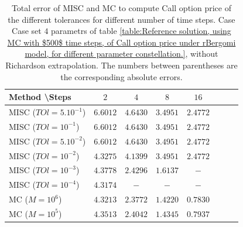 \documentclass[11pt]{article}
\begin{document}
\begin{table}[h!]
	\centering
	\begin{tabular}{l*{6}{c}r}
		Method \textbackslash  Steps            & $2$ & $4$ & $8$ & $16$  \\
		\hline
		MISC ($TOl=5.10^{-1}$)  & $\mathbf{6.6012}$ & $\mathbf{ 4.6430}$ & $\mathbf{3.4951}$ & $\mathbf{ 2.4772}$  \\
		MISC ($TOl=10^{-1}$)  & $\mathbf{6.6012}$ & $\mathbf{ 4.6430}$& $\mathbf{3.4951}$ & $\mathbf{ 2.4772}$ \\
		MISC ($TOl=5.10^{-2}$)  &$\mathbf{6.6012}$& $\mathbf{ 4.6430}$& $\mathbf{3.4951}$ & $\mathbf{ 2.4772}$ \\
		MISC ($TOl=10^{-2}$)  & $\mathbf{ 4.3275}$ & $\mathbf{4.1399}$ & $\mathbf{3.4951}$ & $\mathbf{ 2.4772}$  \\
		
		MISC ($TOl=10^{-3}$)  & $\mathbf{ 4.3778}$ & $\mathbf{2.4296}$ & $\mathbf{1.6137}$ & $\mathbf{ -}$  \\
		MISC ($TOl=10^{-4}$)  & $\mathbf{ 4.3174}$ & $\mathbf{-}$ & $\mathbf{-}$ & $\mathbf{ -}$  \\
		\hline
		MC  ($M=10^6$)   & $\mathbf{ 4.3213}$  & $\mathbf{2.3772
		}$  & $\mathbf{
			1.4220
		}$ & $\mathbf{  0.7830
		}$  \\	
		
		MC  ($M=10^5$)   & $\mathbf{4.3513}$  & $\mathbf{2.4042
		}$  & $\mathbf{
			1.4345
		}$ & $\mathbf{  0.7937
		}$  \\		
		
		\hline
	\end{tabular}
	\caption{Total error of MISC and MC to compute Call option price of the different tolerances for different number of time steps. Case Case set $4$ parametrs of table \ref{table:Reference solution, using MC with $500$ time steps, of Call option price under rBergomi model, for different parameter constellation.}, without Richardson extrapolation. The numbers between parentheses are the corresponding absolute errors.}
	\label{Total error of MISC and MC to compute Call option price of the different tolerances for different number of time steps. Case set 4, without Richardson extrapolation. The numbers between parentheses are the corresponding absolute errors.}
\end{table}
\end{document}
